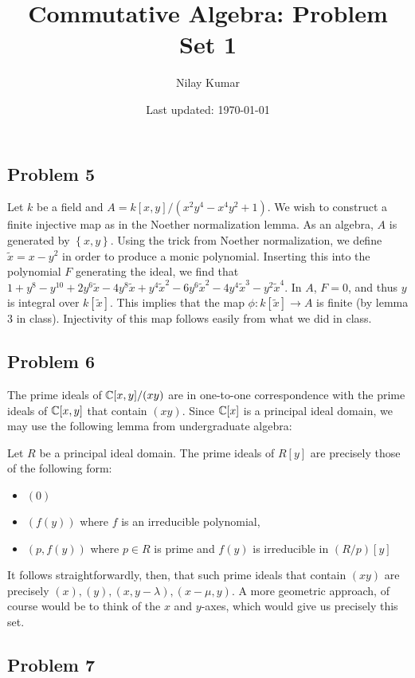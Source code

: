\documentclass{../../mathnotes}
\title{Commutative Algebra: Problem Set 1}
\author{Nilay Kumar}
\date{Last updated: \today}
\begin{document}
\maketitle

\subsection*{Problem 5}

Let $k$ be a field and $A=k[x,y]/(x^2y^4-x^4y^2+1)$. We wish to construct a finite injective map as in the Noether normalization lemma. As an algebra, $A$ is generated by $\left\{ x,y \right\}$.
Using the trick from Noether normalization, we define $\tilde x=x-y^2$ in order to produce a monic polynomial. Inserting this into the polynomial $F$ generating the ideal,
we find that $1+y^8-y^{10}+2 y^6 \tilde{x}-4 y^8 \tilde{x}+y^4 \tilde{x}^2-6 y^6 \tilde{x}^2-4 y^4 \tilde{x}^3-y^2 \tilde{x}^4$. In $A$, $F=0$, and thus $y$ is integral over
$k[\tilde x]$. This implies that the map $\phi:k[\tilde x]\to A$ is finite (by lemma 3 in class). Injectivity of this map follows easily from what we did in class.

\subsection*{Problem 6}

The prime ideals of $\mathbb{C}[x,y]/(xy)$ are in one-to-one correspondence with the prime ideals of $\mathbb{C}[x,y]$ that contain $(xy)$.
Since $\mathbb{C}[x]$ is a principal ideal domain, we may use the following lemma from undergraduate algebra:
\begin{lem}
    Let $R$ be a principal ideal domain. The prime ideals of $R[y]$ are precisely those of the following form:
    \begin{itemize}
        \item $(0)$
        \item $(f(y))$ where $f$ is an irreducible polynomial,
        \item $(p,f(y))$ where $p\in R$ is prime and $f(y)$ is irreducible in $(R/p)[y]$
    \end{itemize}
\end{lem}
It follows straightforwardly, then, that such prime ideals that contain $(xy)$ are precisely $(x),(y),(x,y-\lambda),(x-\mu,y)$.
A more geometric approach, of course would be to think of the $x$ and $y$-axes, which would give us precisely this set.


\subsection*{Problem 7}
\end{document}
